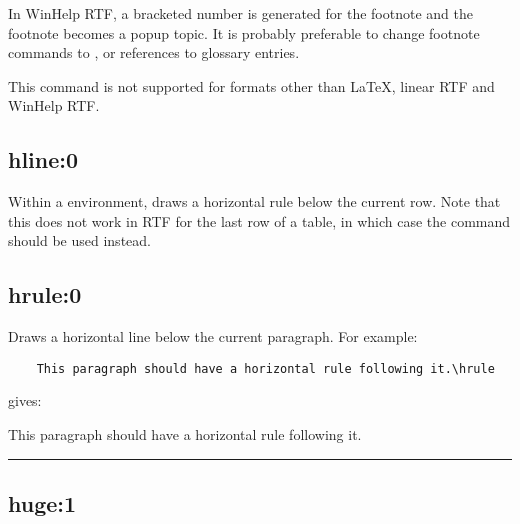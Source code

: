 In WinHelp RTF, a bracketed number is generated for the footnote
and the footnote becomes a popup topic. It is probably preferable
to change footnote commands to ,
or  references to glossary entries.

This command is not supported for formats other than \LaTeX,
linear RTF and WinHelp RTF.

\subsection*{hline:0}\label{hline}

Within a  environment, draws a horizontal
rule below the current row. Note that this does not work in RTF for the
last row of a table, in which case the command \rtfsp
should be used instead.

\subsection*{hrule:0}\label{hrule}

Draws a horizontal line below the current paragraph. For example:

\begin{verbatim}
    This paragraph should have a horizontal rule following it.\hrule
\end{verbatim}

gives:

This paragraph should have a horizontal rule following it.\hrule


\subsection*{huge:1}\label{huge1}

